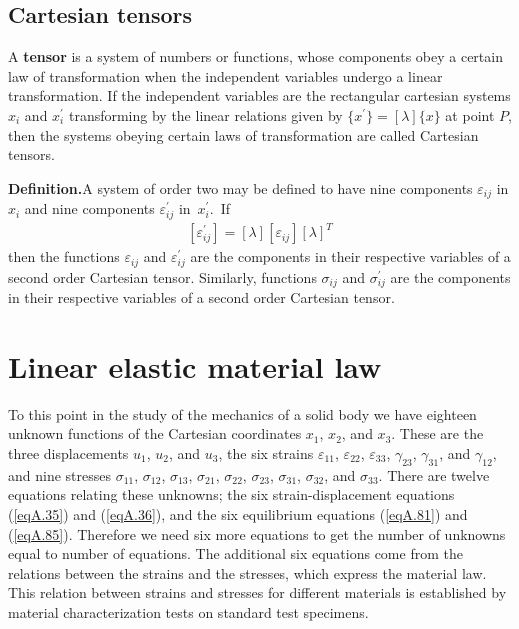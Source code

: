 \documentclass{AeroStructure-ERJohnson}
\begin{document}
\subsection{Cartesian tensors}\label{secA.2.3}

A \textbf{tensor} is a system of numbers or functions, whose components obey a certain law of transformation when the independent variables undergo a linear transformation. If the independent variables are the rectangular cartesian systems $x_{i}$ and $x_{i}^{\prime}$ transforming by the linear relations given by $\{x^{\prime}\}=[\lambda]\{x\}$ at point $P$, then the systems obeying certain laws of transformation are called Cartesian tensors.

\smallskip\vspace*{-2pt}%

\noindent\textbf{Definition.}\enspace A system of order two may be defined to have nine components $\varepsilon_{i j}$ in $x_{i}$ and nine components $\varepsilon_{ij}^{\prime}$ in~$x_{i}^{\prime}$.~If
\begin{align}\label{eqA.98}
[\varepsilon_{i j}^{\prime}]=[\lambda][\varepsilon_{i j}][\lambda]^{T}
\end{align}
then the functions $\varepsilon_{ij}$ and $\varepsilon_{ij}^{\prime}$ are the components in their respective variables of a second order Cartesian tensor. Similarly, functions $\sigma_{ij}$ and $\sigma_{ij}^{\prime}$ are the components in their respective variables of a second order Cartesian tensor.

\section{Linear elastic material law}\label{secA.3}

To this point in the study of the mechanics of a solid body we have eighteen unknown functions of the Cartesian coordinates $x_{1}$, $x_{2}$, and $x_{3}$. These are the three displacements $u_{1}$, $u_{2}$, and $u_{3}$, the six strains $\varepsilon_{11}$, $\varepsilon_{22}$, $\varepsilon_{33}$, $\gamma_{23}$, $\gamma_{31}$, and $\gamma_{12}$, and nine stresses $\sigma_{11}$, $\sigma_{12}$, $\sigma_{13}$, $\sigma_{21}$, $\sigma_{22}$, $\sigma_{23}$, $\sigma_{31}$, $\sigma_{32}$, and $\sigma_{33}$. There are twelve equations relating these unknowns; the six strain-displacement equations (\ref{eqA.35}) and (\ref{eqA.36}), and the six equilibrium equations (\ref{eqA.81}) and (\ref{eqA.85}). Therefore we need six more equations to get the number of unknowns equal to number of equations. The additional six equations come from the relations between the strains and the stresses, which express the material law. This relation between strains and stresses for different materials is established by material characterization tests on standard test specimens.
\end{document}
